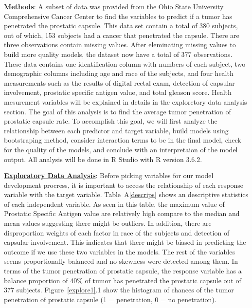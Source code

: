 \documentclass[11pt]{article}\usepackage[]{graphicx}\usepackage[]{color}
\begin{document}
\noindent\textbf{\underline{Methods}}: A subset of data was provided from the Ohio State University Comprehensive Cancer Center to find the variables to predict if a tumor has penetrated the prostatic capsule. This data set contain a total of 380 subjects, out of which, 153 subjects had a cancer that penetrated the capsule. There are three observations contain missing values. After eleminating missing values to build more quality models, the dataset now have a total of 377 observations. These data contains one identification column with numbers of each subject, two demographic columns including age and race of the subjects, and four health measurements such as the results of digital rectal exam, detection of capsular involvement, prostatic specific antigen value, and total gleason score. Health mesurement variables will be explained in details in the exploretory data analysis section. The goal of this analysis is to find the average tumor penetration of prostatic capsule rate. To accomplish this goal, we will first analyze the relationship between each predictor and target variable, build models using bootstraping method, consider interaction terms to be in the final model, check for the quality of the models, and conclude with an interpretaion of the model output. All analysis will be done in R Studio with R version 3.6.2.        
\hfill \break

\noindent\textbf{\underline{Exploratory Data Analysis}}: Before picking variables for our model development procress, it is important to access the relationship of each response variable with the target variable. Table~A\ref{descrips} shows an descriptive statistics of each independent variable. As seen in this table, the maximum value of Prostatic Specific Antigen value are relatively high compare to the median and mean values suggesting there might be outliers. In addition, there are disproportion weights of each factor in race of the subjects and detection of capsular involvement. This indicates that there might be biased in predicting the outcome if we use these two variables in the models. The rest of the variables seems proportionally balanced and no skewness were detected among them. In terms of the tumor penetration of prostatic capsule, the response variable has a balance proportion of 40\% of tumor has penetrated the prostatic capsule out of 377 subjects. Figure~\ref{explore1}.1 show the histogram of chances of the tumor penetration of prostatic capsule (1 = penetration, 0 = no penetration).  
\end{document}
